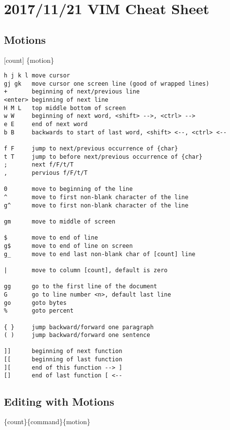 \documentclass{article}
\author{}
\date{}
\begin{document}
\section{2017/11/21 VIM Cheat Sheet}\label{vim-cheat-sheet}

\subsection{Motions}\label{motions}

{[}count{]} \{motion\}

\begin{verbatim}
h j k l move cursor
gj gk   move cursor one screen line (good of wrapped lines)
+       beginning of next/previous line 
<enter> beginning of next line
H M L   top middle bottom of screen
w W     beginning of next word, <shift> -->, <ctrl> -->
e E     end of next word
b B     backwards to start of last word, <shift> <--, <ctrl> <--

f F     jump to next/previous occurrence of {char}
t T     jump to before next/previous occurrence of {char}
;       next f/F/t/T 
,       pervious f/F/t/T

0       move to beginning of the line
^       move to first non-blank character of the line
g^      move to first non-blank character of the line

gm      move to middle of screen

$       move to end of line
g$      move to end of line on screen
g_      move to end last non-blank char of [count] line

|       move to column [count], default is zero

gg      go to the first line of the document
G       go to line number <n>, default last line
go      goto bytes
%       goto percent

{ }     jump backward/forward one paragraph
( )     jump backward/forward one sentence

]]      beginning of next function
[[      beginning of last function
][      end of this function --> ]
[]      end of last function [ <--
\end{verbatim}

\newpage

\subsection{Editing with Motions}\label{editing-with-motions}

\{count\}\{command\}\{motion\}
\end{document}
